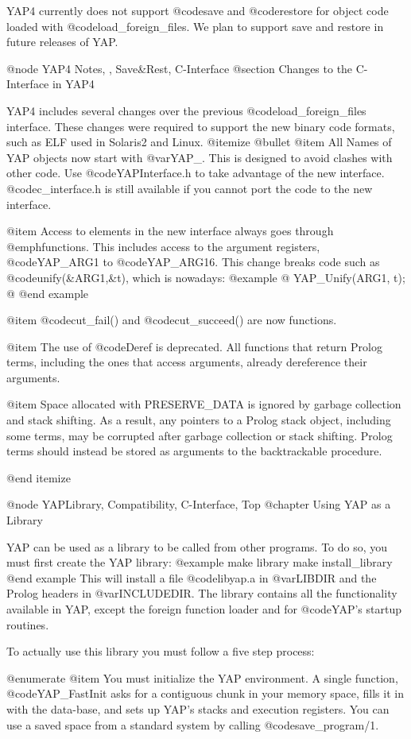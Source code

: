 {{{{{{{{{YAP4 currently does not support @code{save} and @code{restore} for object code
loaded with @code{load_foreign_files}. We plan to support save and restore
in future releases of YAP.

@node YAP4 Notes, , Save&Rest, C-Interface
@section Changes to the C-Interface in YAP4

YAP4 includes several changes over the previous @code{load_foreign_files}
interface. These changes were required to support the new binary code
formats, such as ELF used in Solaris2 and Linux.
@itemize @bullet
@item All Names of YAP objects now start with @var{YAP_}. This is
designed to avoid clashes with other code. Use @code{YAPInterface.h} to
take advantage of the new interface. @code{c_interface.h} is still
available if you cannot port the code to the new interface.

@item Access to elements in the new interface always goes through
@emph{functions}. This includes access to the argument registers,
@code{YAP_ARG1} to @code{YAP_ARG16}. This change breaks code such as
@code{unify(&ARG1,&t)}, which is nowadays:
@example
@{
   YAP_Unify(ARG1, t);
@}
@end example

@item @code{cut_fail()} and @code{cut_succeed()} are now functions.

@item The use of @code{Deref} is deprecated. All functions that return
Prolog terms, including the ones that access arguments, already
dereference their arguments.

@item Space allocated with PRESERVE_DATA is ignored by garbage
collection and stack shifting. As a result, any pointers to a Prolog
stack object, including some terms, may be corrupted after garbage
collection or stack shifting. Prolog terms should instead be stored as
arguments to the backtrackable procedure.

@end itemize

@node YAPLibrary, Compatibility, C-Interface, Top
@chapter Using YAP as a Library

YAP can be used as a library to be called from other
programs. To do so, you must first create the YAP library:
@example
make library
make install_library
@end example
This will install a file @code{libyap.a} in @var{LIBDIR} and the Prolog
headers in @var{INCLUDEDIR}. The library contains all the functionality
available in YAP, except the foreign function loader and for
@code{YAP}'s startup routines.

To actually use this library you must follow a five step process:

@enumerate
@item
 You must initialize the YAP environment. A single function,
@code{YAP_FastInit} asks for a contiguous chunk in your memory space, fills
it in with the data-base, and sets up YAP's stacks and
execution registers. You can use a saved space from a standard system by
calling @code{save_program/1}.
     
}}}}}}}}}
